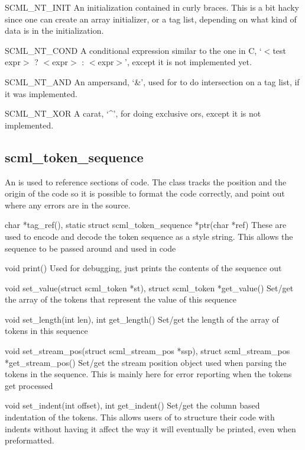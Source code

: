 \begin{cidentifierlist}
  \item[SCML_NT_INIT]
  An initialization contained in curly braces.  This is a bit hacky since one
  can create an array initializer, or a tag list, depending on what kind of
  data is in the initialization.

  \item[SCML_NT_COND]
  A conditional expression similar to the one in C, `$<$test expr$>$ ? $<$expr$>$ :
  $<$expr$>$', except it is not implemented yet.

  \item[SCML_NT_AND]
  An ampersand, `\&', used for to do intersection on a tag list, if it was
  implemented.

  \item[SCML_NT_XOR]
  A carat, `\^{ }', for doing exclusive ors, except it is not implemented.
\end{cidentifierlist}

\subsection{scml\_token\_sequence}

An  is used to reference sections of \SCML{} code.  The
class tracks the position and the origin of the code so it is possible to format
the code correctly, and point out where any errors are in the source.

\begin{cprototypelist}
  \item[char *tag_ref(), static struct scml_token_sequence
  *ptr(char *ref)] These are used to encode and decode the token sequence as a
   style string.  This allows the sequence to be passed
  around and used in \SCML{} code

  \item[void print()] Used for debugging, just prints the contents
  of the sequence out

  \item[void set_value(struct scml_token *st), struct scml_token
  *get_value()] Set/get the array of the tokens that represent the value of
  this sequence

  \item[void set_length(int len), int get_length()] Set/get the
  length of the array of tokens in this sequence

  \item[void set_stream_pos(struct scml_stream_pos *ssp), struct
  scml_stream_pos *get_stream_pos()] Set/get the stream position object used
  when parsing the tokens in the sequence.  This is mainly here for error
  reporting when the tokens get processed

  \item[void set_indent(int offset), int get_indent()] Set/get the
  column based indentation of the tokens.  This allows users of \SCML{} to
  structure their code with indents without having it affect the way it will
  eventually be printed, even when preformatted.
\end{cprototypelist}

